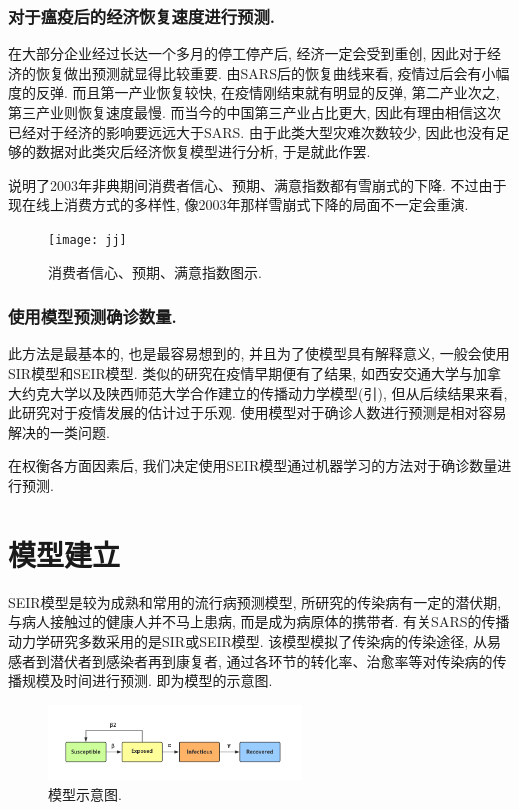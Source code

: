 \documentclass[lang=cn,11pt]{elegantpaper}
\begin{document}
\subsubsection*{对于瘟疫后的经济恢复速度进行预测. }
在大部分企业经过长达一个多月的停工停产后, 经济一定会受到重创, 因此对于经济的恢复做出预测就显得比较重要. 由SARS后的恢复曲线来看, 疫情过后会有小幅度的反弹. 而且第一产业恢复较快, 在疫情刚结束就有明显的反弹, 第二产业次之, 第三产业则恢复速度最慢. 而当今的中国第三产业占比更大, 因此有理由相信这次已经对于经济的影响要远远大于SARS. 由于此类大型灾难次数较少, 因此也没有足够的数据对此类灾后经济恢复模型进行分析, 于是就此作罢. 

 说明了2003年非典期间消费者信心、预期、满意指数都有雪崩式的下降. 不过由于现在线上消费方式的多样性, 像2003年那样雪崩式下降的局面不一定会重演. 
\begin{figure}[htbp]
  \centering
  \texttt{[image: jj]}
  \caption{消费者信心、预期、满意指数图示. \label{fig:jingji}}
\end{figure}
\subsubsection*{使用模型预测确诊数量. }
此方法是最基本的, 也是最容易想到的, 并且为了使模型具有解释意义, 一般会使用SIR模型和SEIR模型. 类似的研究在疫情早期便有了结果, 如西安交通大学与加拿大约克大学以及陕西师范大学合作建立的传播动力学模型(引), 但从后续结果来看, 此研究对于疫情发展的估计过于乐观. 使用模型对于确诊人数进行预测是相对容易解决的一类问题. 

在权衡各方面因素后, 我们决定使用SEIR模型通过机器学习的方法对于确诊数量进行预测.
\section{模型建立} 
SEIR模型是较为成熟和常用的流行病预测模型, 所研究的传染病有一定的潜伏期, 与病人接触过的健康人并不马上患病, 而是成为病原体的携带者. 有关SARS的传播动力学研究多数采用的是SIR或SEIR模型. 该模型模拟了传染病的传染途径, 从易感者到潜伏者到感染者再到康复者, 通过各环节的转化率、治愈率等对传染病的传播规模及时间进行预测.  即为模型的示意图.
\begin{figure}[htbp]
  \centering
  \includegraphics[width=0.6\textwidth]{lct}
  \caption{模型示意图. \label{fig:bu zhou}}
\end{figure}
\end{document}
